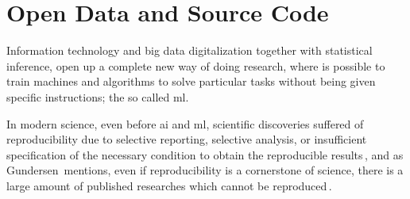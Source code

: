 \section{Open Data and Source Code}
%
Information technology and big data digitalization together with statistical inference,
open up a complete new way of doing research, where is possible to train machines
and algorithms to solve particular tasks without being given specific instructions; the so called
\ac{ml}.

In modern science, even before \ac{ai} and \ac{ml}, scientific discoveries suffered of reproducibility due
to selective reporting, selective analysis, or insufficient specification of the necessary condition to obtain the
reproducible results\,\cite{aarts2016reproducibility}, and as Gundersen\,\cite{gundersen2018state}
mentions, even if reproducibility is a cornerstone of science, there is a large amount of published
researches which cannot be reproduced\,\cite{begley2012drug, begley2015reproducibility, prinz2011believe}.


